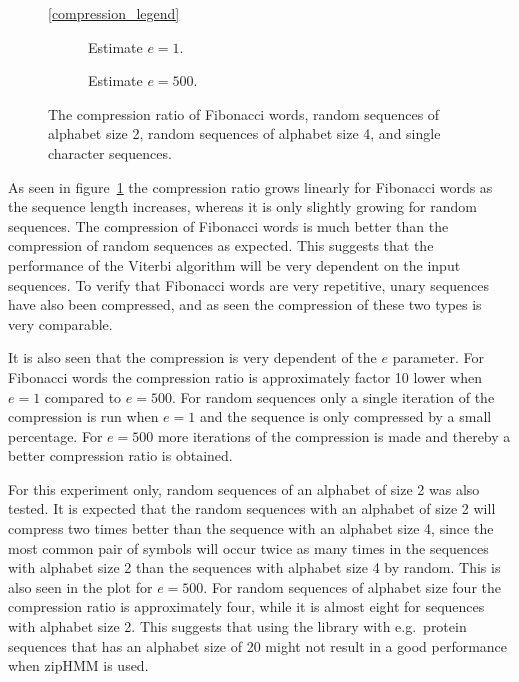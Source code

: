 \begin{figure}
  \centering\ref{compression_legend}
  \begin{subfigure}[b]{0.5\textwidth}
    \centering 
    \caption{Estimate $e = 1$.}
  \end{subfigure}%
  \begin{subfigure}[b]{0.5\textwidth}
    \centering 
    \caption{Estimate $e = 500$.}
  \end{subfigure}
  \caption{The compression ratio of Fibonacci words, random sequences of
    alphabet size 2, random sequences of alphabet size 4, and single character
    sequences.}
  \label{fig:compression_ratio}
\end{figure}

As seen in figure~\ref{fig:compression_ratio} the compression ratio grows
linearly for Fibonacci words as the sequence length increases, whereas it
is only slightly growing for random sequences. The compression of Fibonacci
words is much better than the compression of random sequences as
expected. This suggests that the performance of the Viterbi algorithm will be
very dependent on the input sequences. To verify that Fibonacci words
are very repetitive, unary sequences have also been compressed, and as seen the
compression of these two types is very comparable.

It is also seen that the compression is very dependent of the $e$ parameter.
For Fibonacci words the compression ratio is approximately factor 10 lower when
$e = 1$ compared to $e = 500$. For random sequences only a single iteration of
the compression is run when $e = 1$ and the sequence is only compressed by a
small percentage. For $e = 500$ more iterations of the compression is made and
thereby a better compression ratio is obtained.

For this experiment only, random sequences of an alphabet of size 2 was also
tested. It is expected that the random sequences with an alphabet of size 2
will compress two times better than the sequence with an alphabet size 4, since
the most common pair of symbols will occur twice as many times in the sequences
with alphabet size 2 than the sequences with alphabet size 4 by random. This is
also seen in the plot for $e = 500$. For random sequences of alphabet size four
the compression ratio is approximately four, while it is almost eight for
sequences with alphabet size 2. This suggests that using the library with e.g.\
protein sequences that has an alphabet size of 20 might not result in a good
performance when zipHMM is used.

